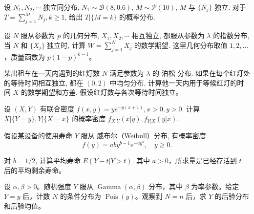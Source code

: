 \begin{exercise}[随机组数下的条件二项]\label{q:A6.1}
设 $N_1,N_2,\cdots$ 独立同分布, $N_1\sim\mathcal{B}(8,0.6)$, $M\sim\mathcal{P}(10)$, $M$ 与 $\{N_j\}$ 独立. 对于 $T=\sum\limits_{j=1}^MN_j,k\geq1$, 给出 $T|\{M=k\}$ 的概率分布.\par{}\end{exercise}

\begin{exercise}[几何个指数等待之和]\label{q:A6.3}
设 $N$ 服从参数为 $p$ 的几何分布, $X_1,X_2,\cdots$ 相互独立, 都服从参数为 $\lambda$ 的指数分布, 当 $N$ 和 $\{X_j\}$ 独立时, 计算 $W=\sum\limits_{j=1}^NX_j$ 的数学期望. 这里几何分布取值 $1,2,\ldots$，质量函数为 $p(1-p)^{k-1}$。\par{}\end{exercise}

\begin{exercise}[复合泊松等待的均值方差]\label{q:A6.4}
某出租车在一天内遇到的红灯数 $N$ 满足参数为 $\lambda$ 的 泊松 分布. 如果在每个红灯处的等待时间相互独立, 都在 $(0,2)$ 中均匀分布, 计算他一天内用于等候红灯的时间 $X$ 的数学期望和方差. 假设红灯数与各次等待时间独立。\par{}\end{exercise}

\begin{exercise}[条件指数与条件伽马]\label{q:A6.9}
设 $(X,Y)$ 有联合密度 $f(x,y)=ye^{-y(x+1)},x>0,y>0$. 计算 $X|\{Y=y\},Y|\{X=x\}$ 的概率密度 $f_{X|Y}(x|y),f_{Y|X}(y|x)$.\par{}\end{exercise}

\begin{exercise}[威布尔寿命的剩余等待]\label{q:A6.14}
假设某设备的使用寿命 $Y$ 服从 威布尔（Weibull）分布, 有概率密度
    \[f(y)=aby^{b-1}e^{-ay^b},\quad y\geq0.\]

    对 $b=1/2$, 计算平均寿命 $E(Y-t|Y>t)$. 其中 $a>0$，所求量是已经存活到 $t$ 后的平均剩余寿命。\par{}\end{exercise}

\begin{exercise}[泊松观察后的伽马后验]\label{q:A6.15}
设 $\alpha,\beta>0$。随机强度 $Y$ 服从 $\operatorname{Gamma}(\alpha,\beta)$ 分布，其中 $\beta$ 为率参数。给定 $Y=y$ 后，计数 $N$ 的条件分布为 $\operatorname{Pois}(y)$。观察到 $N=n$ 后，求 $Y$ 的后验分布和后验均值。\par{}\end{exercise}

